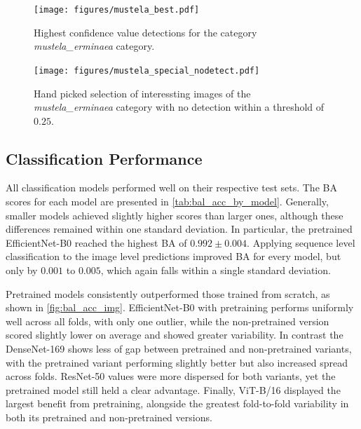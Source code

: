     

    \begin{figure}[]
    \centering
    \texttt{[image: figures/mustela\_best.pdf]}
    \caption{Highest confidence value detections for the category \textit{mustela\_erminaea} category.}
    \label{fig:detection_mustela_best}
    \end{figure}

    \begin{figure}[]
    \centering
    \texttt{[image: figures/mustela\_special\_nodetect.pdf]}
    \caption{Hand picked selection of interessting images of the \textit{mustela\_erminaea} category with no detection within a threshold of \(0.25\).}
    \label{fig:detection_special_nodetect}
    \end{figure}


    \subsection{Classification Performance}

    All classification models performed well on their respective test sets.
    The \ac{BA} scores for each model are presented in \autoref{tab:bal_acc_by_model}.
    Generally, smaller models achieved slightly higher scores than larger ones, although these differences remained within one standard deviation.
    In particular, the pretrained EfficientNet-B0 reached the highest \ac{BA} of \(0.992\pm0.004\).
    Applying sequence level classification to the image level predictions improved \ac{BA} for every model, but only by \(0.001\) to \(0.005\), which again falls within a single standard deviation.

    Pretrained models consistently outperformed those trained from scratch, as shown in \autoref{fig:bal_acc_img}.
    EfficientNet-B0 with pretraining performs uniformly well across all folds, with only one outlier, while the non-pretrained version scored slightly lower on average and showed greater variability.
    In contrast the DenseNet-169 shows less of gap between pretrained and non-pretrained variants, with the pretrained variant performing slightly better but also increased spread across folds.
    ResNet-50 values were more dispersed for both variants, yet the pretrained model still held a clear advantage. 
    Finally, ViT-B/16 displayed the largest benefit from pretraining, alongside the greatest fold-to-fold variability in both its pretrained and non-pretrained versions.

